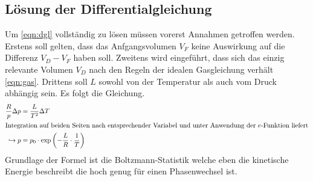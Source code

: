 \subsection{Lösung der Differentialgleichung}
Um \eqref{eqn:dgl} vollständig zu lösen müssen vorerst Annahmen getroffen werden. 
Erstens soll gelten, dass das Anfgangsvolumen $V_F$ keine Auswirkung auf die Differenz $V_D - V_F$ haben soll. Zweitens wird eingeführt, dass 
sich das einzig relevante Volumen $V_D$ nach den Regeln der idealen Gasgleichung verhält \eqref{eqn:gas}. Drittens soll $L$ sowohl von der Temperatur
als auch vom Druck abhängig sein.
Es folgt die Gleichung.
\begin{align}
\label{eqn:wichtig}
    \frac{R}{p} \Delta p &= \frac{L}{T^2} \Delta T \\
    \intertext{Integration auf beiden Seiten nach entsprechender Variabel und unter Anwendung der $e$-Funktion liefert}
    \hookrightarrow p &= p_0 \cdot \text{exp} \left(-\frac{L}{R} \cdot \frac{1}{T}\right)
\end{align}
Grundlage der Formel ist die Boltzmann-Statistik welche eben die kinetische Energie beschreibt die hoch genug für einen Phasenwechsel ist. 
